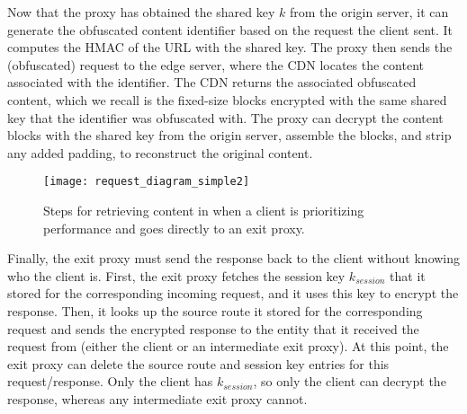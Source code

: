 Now that the proxy has obtained the shared key $k$ from the origin server, it can generate the obfuscated content identifier based 
on the request the client sent.  It computes the HMAC of the URL with the shared key.  The proxy then 
sends the (obfuscated) request to the edge server, where the CDN locates the content associated with the identifier.  The CDN returns 
the associated obfuscated content, which we recall is the fixed-size blocks encrypted with the same shared key that the identifier was 
obfuscated with.  The proxy can decrypt the content blocks with the shared key from the origin server, assemble the blocks, and strip any 
added padding, to reconstruct the original content.

\begin{figure}[t!]
\centering
\texttt{[image: request\_diagram\_simple2]}
\caption{Steps for retrieving content in \system{} when a client is prioritizing 
performance and goes directly to an exit proxy.}
\label{fig:retrieving}
\end{figure}


Finally, the exit proxy must send the response back to the client without
knowing who the client is.  First, the exit proxy fetches the session key $k_{session}$
that it stored for the corresponding incoming request, and it uses this key to encrypt the response.  Then, it looks up the source route it stored for the corresponding request 
and sends the encrypted response to the entity that it received the request from (either the client or an intermediate exit proxy).  At this point, the exit proxy can delete the source route and session key entries 
for this request/response.  Only the client has $k_{session}$, so only the client can decrypt the response, whereas any intermediate exit proxy cannot.  


